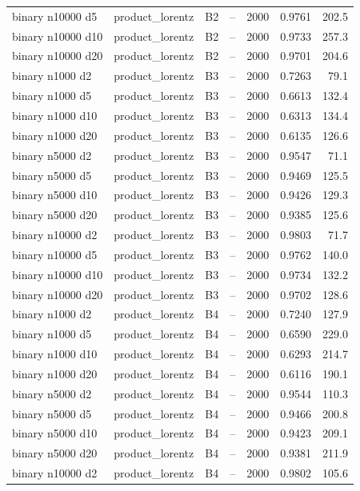 \begin{longtable}{llllrrr}
binary n10000 d5 & product\_lorentz & B2 & -- & 2000 & 0.9761 & 202.5 \\
binary n10000 d10 & product\_lorentz & B2 & -- & 2000 & 0.9733 & 257.3 \\
binary n10000 d20 & product\_lorentz & B2 & -- & 2000 & 0.9701 & 204.6 \\
binary n1000 d2 & product\_lorentz & B3 & -- & 2000 & 0.7263 & 79.1 \\
binary n1000 d5 & product\_lorentz & B3 & -- & 2000 & 0.6613 & 132.4 \\
binary n1000 d10 & product\_lorentz & B3 & -- & 2000 & 0.6313 & 134.4 \\
binary n1000 d20 & product\_lorentz & B3 & -- & 2000 & 0.6135 & 126.6 \\
binary n5000 d2 & product\_lorentz & B3 & -- & 2000 & 0.9547 & 71.1 \\
binary n5000 d5 & product\_lorentz & B3 & -- & 2000 & 0.9469 & 125.5 \\
binary n5000 d10 & product\_lorentz & B3 & -- & 2000 & 0.9426 & 129.3 \\
binary n5000 d20 & product\_lorentz & B3 & -- & 2000 & 0.9385 & 125.6 \\
binary n10000 d2 & product\_lorentz & B3 & -- & 2000 & 0.9803 & 71.7 \\
binary n10000 d5 & product\_lorentz & B3 & -- & 2000 & 0.9762 & 140.0 \\
binary n10000 d10 & product\_lorentz & B3 & -- & 2000 & 0.9734 & 132.2 \\
binary n10000 d20 & product\_lorentz & B3 & -- & 2000 & 0.9702 & 128.6 \\
binary n1000 d2 & product\_lorentz & B4 & -- & 2000 & 0.7240 & 127.9 \\
binary n1000 d5 & product\_lorentz & B4 & -- & 2000 & 0.6590 & 229.0 \\
binary n1000 d10 & product\_lorentz & B4 & -- & 2000 & 0.6293 & 214.7 \\
binary n1000 d20 & product\_lorentz & B4 & -- & 2000 & 0.6116 & 190.1 \\
binary n5000 d2 & product\_lorentz & B4 & -- & 2000 & 0.9544 & 110.3 \\
binary n5000 d5 & product\_lorentz & B4 & -- & 2000 & 0.9466 & 200.8 \\
binary n5000 d10 & product\_lorentz & B4 & -- & 2000 & 0.9423 & 209.1 \\
binary n5000 d20 & product\_lorentz & B4 & -- & 2000 & 0.9381 & 211.9 \\
binary n10000 d2 & product\_lorentz & B4 & -- & 2000 & 0.9802 & 105.6 \\

\end{longtable}
